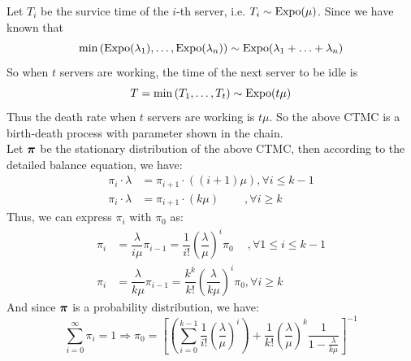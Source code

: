 \begin{homeworkProblem}
\begin{center}
\end{center}
Let $T_i$ be the survice time of the $i$-th server, i.e. $T_i\sim \operatorname{Expo}(\mu)$. Since we have known that
$$\min\left(\operatorname{Expo}(\lambda_1),\ldots,\operatorname{Expo}(\lambda_n)\right)\sim\operatorname{Expo}(\lambda_1+\ldots+\lambda_n)$$
So when $t$ servers are working, the time of the next server to be idle is
$$T=\min\left(T_1,\ldots,T_t\right)\sim\operatorname{Expo}(t\mu)$$
Thus the death rate when $t$ servers are working is $t\mu$. So the above CTMC is a birth-death process with parameter shown in the chain. \\
Let $\boldsymbol{\pi}$ be the stationary distribution of the above CTMC, then according to the detailed balance equation, we have:
\begin{align*}
\pi_i\cdot\lambda &= \pi_{i+1}\cdot((i+1)\mu), \forall i\leq k-1 \\
\pi_i\cdot\lambda &= \pi_{i+1}\cdot(k\mu) \qquad\ , \forall i\geq k
\end{align*}
Thus, we can express $\pi_i$ with $\pi_0$ as:
\begin{align*}
\pi_i &= \dfrac{\lambda}{i\mu}\pi_{i-1} = \dfrac{1}{i!}\left(\dfrac{\lambda}{\mu}\right)^i\pi_0 \quad\ , \forall 1\leq i\leq k-1 \\
\pi_i &= \dfrac{\lambda}{k\mu}\pi_{i-1} = \dfrac{k^k}{k!}\left(\dfrac{\lambda}{k\mu}\right)^i\pi_0, \forall i\geq k
\end{align*}
And since $\boldsymbol{\pi}$ is a probability distribution, we have:
$$\sum_{i=0}^{\infty}\pi_i = 1\Rightarrow \pi_0 = \left[
\left(\sum_{i=0}^{k-1}\dfrac{1}{i!}\left(\dfrac{\lambda}{\mu}\right)^i\right)+
\dfrac{1}{k!}\left(\dfrac{\lambda}{\mu}\right)^k\dfrac{1}{1-\frac{\lambda}{k\mu}}\right]^{-1}$$


\end{homeworkProblem}
